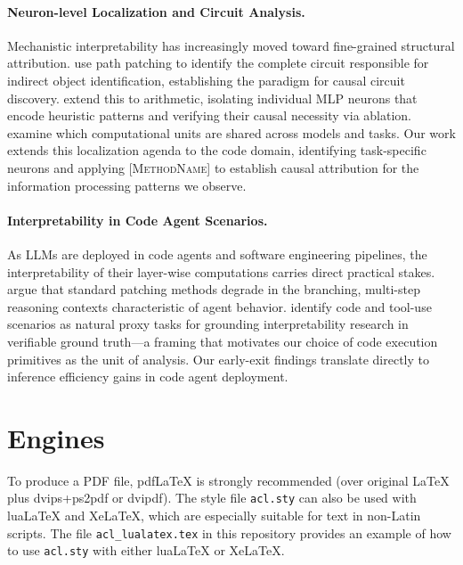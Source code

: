 \documentclass[11pt]{article}
\begin{document}
\paragraph{Neuron-level Localization and Circuit Analysis.}
Mechanistic interpretability has increasingly moved toward fine-grained structural attribution.
\citet{wang2022ioi} use path patching to identify the complete circuit responsible for indirect object identification, establishing the paradigm for causal circuit discovery.
\citet{nikankin2025arithmetic} extend this to arithmetic, isolating individual MLP neurons that encode heuristic patterns and verifying their causal necessity via ablation.
\citet{universalneurons2024} examine which computational units are shared across models and tasks.
Our work extends this localization agenda to the code domain, identifying task-specific neurons and applying \textsc{[MethodName]} to establish causal attribution for the information processing patterns we observe.
 
\paragraph{Interpretability in Code Agent Scenarios.}
As LLMs are deployed in code agents and software engineering pipelines, the interpretability of their layer-wise computations carries direct practical stakes.
\citet{nanda2025resampling} argue that standard patching methods degrade in the branching, multi-step reasoning contexts characteristic of agent behavior.
\citet{nanda2025pragmatic} identify code and tool-use scenarios as natural proxy tasks for grounding interpretability research in verifiable ground truth---a framing that motivates our choice of code execution primitives as the unit of analysis.
Our early-exit findings translate directly to inference efficiency gains in code agent deployment.



\section{Engines}

To produce a PDF file, pdf\LaTeX{} is strongly recommended (over original \LaTeX{} plus dvips+ps2pdf or dvipdf).
The style file \texttt{acl.sty} can also be used with
lua\LaTeX{} and
Xe\LaTeX{}, which are especially suitable for text in non-Latin scripts.
The file \texttt{acl\_lualatex.tex} in this repository provides
an example of how to use \texttt{acl.sty} with either
lua\LaTeX{} or
Xe\LaTeX{}.
\end{document}
